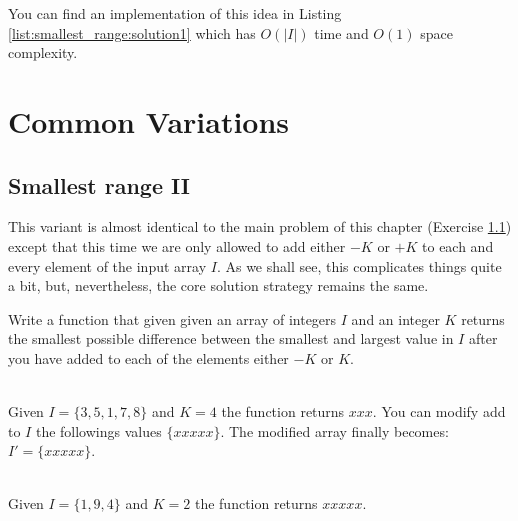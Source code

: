 You can find an implementation of this idea in Listing \ref{list:smallest_range:solution1} which has $O(|I|)$ time and $O(1)$ space complexity.




\section{Common Variations}
\subsection{Smallest range \RN{2} } This variant is almost identical to the main problem of this
chapter (Exercise \ref{}) except that this time we are only allowed to add either $-K$ or $+K$ to
each and every element of the input array $I$. As we shall see, this complicates things quite a bit,
but, nevertheless, the core solution strategy  remains the same. 

\begin{exercise}
	\label{example:smallest_range:variation1:exercice1}
	Write a function that given given an array of integers $I$ and an integer $K$ returns the
	smallest possible difference between the smallest and largest value in $I$ after you have added
	to each of the elements either $-K$ or $K$.
	
		\begin{example}
			\label{example:smallest_range:variation1:example1}
			\hfill \\
			Given $I = \{3,5,1,7,8\}$ and $K=4$ the function returns $xxx$. You can modify add to
			$I$ the followings values $\{xxxxx\}$. The modified array finally becomes:
			$I'=\{xxxxx\}$. 
			
		\end{example}
	
		\begin{example}
			\label{example:smallest_range:variation1:example2}
			\hfill \\
			Given $I = \{1,9,4\}$ and $K=2$ the function returns $xxxxx$.
		\end{example}
	
	\end{exercise}
